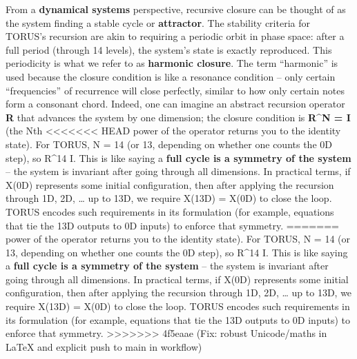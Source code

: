 \documentclass[]{article}
\begin{document}
From a \textbf{dynamical systems} perspective, recursive closure can be
thought of as the system finding a stable cycle or \textbf{attractor}.
The stability criteria for TORUS's recursion are akin to requiring a
periodic orbit in phase space: after a full period (through 14 levels),
the system's state is exactly reproduced. This periodicity is what we
refer to as \textbf{harmonic closure}. The term ``harmonic'' is used
because the closure condition is like a resonance condition -- only
certain ``frequencies'' of recurrence will close perfectly, similar to
how only certain notes form a consonant chord. Indeed, one can imagine
an abstract recursion operator \textbf{R} that advances the system by
one dimension; the closure condition is \textbf{R\^{}N = I} (the Nth
<<<<<<< HEAD
power of the operator returns you to the identity state)\hspace{0pt}.
For TORUS, N = 14 (or 13, depending on whether one counts the 0D step),
so R\^{}14 \approx I. This is like saying a \textbf{full cycle is a symmetry
of the system} -- the system is invariant after going through all
dimensions. In practical terms, if X(0D) represents some initial
configuration, then after applying the recursion through 1D, 2D,
\ldots{} up to 13D, we require X(13D) = X(0D) to close the
loop\hspace{0pt}. TORUS encodes such requirements in its formulation
(for example, equations that tie the 13D outputs to 0D inputs) to
enforce that symmetry.
=======
power of the operator returns you to the identity state)​. For TORUS, N
= 14 (or 13, depending on whether one counts the 0D step), so R\^{}14 \approx
I. This is like saying a \textbf{full cycle is a symmetry of the system}
-- the system is invariant after going through all dimensions. In
practical terms, if X(0D) represents some initial configuration, then
after applying the recursion through 1D, 2D, \ldots{} up to 13D, we
require X(13D) = X(0D) to close the loop​. TORUS encodes such
requirements in its formulation (for example, equations that tie the 13D
outputs to 0D inputs) to enforce that symmetry.
>>>>>>> 4f5eaae (Fix: robust Unicode/maths in LaTeX and explicit push to main in workflow)
\end{document}

